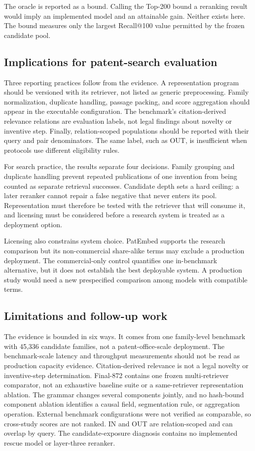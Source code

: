 \documentclass[final,5p,times,twocolumn]{elsarticle}
\begin{document}
The oracle is reported as a bound. Calling the Top-200 bound a reranking result
would imply an implemented model and an
attainable gain. Neither exists here. The bound measures only the largest
Recall@100 value permitted by the frozen candidate pool.

\subsection{Implications for patent-search evaluation}

Three reporting practices follow from the evidence. A representation program
should be versioned with its retriever, not listed as generic preprocessing.
Family normalization, duplicate handling, passage packing, and score
aggregation should appear in the executable configuration. The benchmark's
citation-derived relevance relations are evaluation labels, not legal findings
about novelty or inventive step. Finally,
relation-scoped populations should be reported with their query and pair
denominators. The same label, such as OUT, is insufficient when protocols use
different eligibility rules.

For search practice, the results separate four decisions. Family grouping and
duplicate handling prevent repeated publications of one invention from being
counted as separate retrieval successes. Candidate depth sets a hard ceiling:
a later reranker cannot repair a false negative that never enters its pool.
Representation must therefore be tested with the retriever that will consume
it, and licensing must be considered before a research system is treated as a
deployment option.

Licensing also constrains system choice. PatEmbed supports the research
comparison but its non-commercial share-alike terms may exclude a production
deployment. The commercial-only control quantifies one in-benchmark
alternative, but it does not establish the best deployable system. A
production study would need a new prespecified comparison among models with
compatible terms.

\subsection{Limitations and follow-up work}

The evidence is bounded in six ways. It comes from one family-level benchmark
with 45,336 candidate families, not a patent-office-scale deployment. The
benchmark-scale latency and throughput measurements should not be read as
production capacity evidence. Citation-derived relevance is not a legal
novelty or inventive-step determination.
Final-872 contains one frozen multi-retriever comparator, not an exhaustive
baseline suite or a same-retriever representation ablation. The
grammar changes several components jointly, and no hash-bound component
ablation identifies a causal field, segmentation rule, or aggregation
operation. External benchmark configurations were not verified as comparable,
so cross-study scores are not ranked. IN and OUT are relation-scoped and can
overlap by query. The candidate-exposure diagnosis contains no implemented
rescue model or layer-three
reranker.
\end{document}

